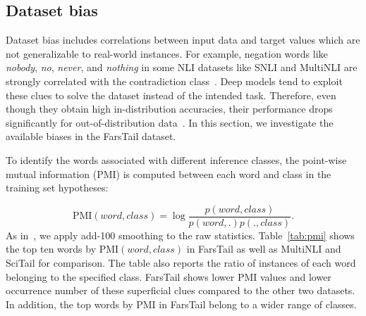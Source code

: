 \documentclass[preprint,12pt]{elsarticle}
\begin{document}
\subsection{Dataset bias}\label{subsec:bias}
Dataset bias includes correlations between input data and target values which are not generalizable to real-world instances. For example, negation words like \textit{nobody}, \textit{no}, \textit{never}, and \textit{nothing} in some NLI datasets like SNLI and MultiNLI are strongly correlated with the contradiction class~\citep{gururangan2018annotation}. Deep models tend to exploit these clues to solve the dataset instead of the intended task. Therefore, even though they obtain high in-distribution accuracies, their performance drops significantly for out-of-distribution data~\citep{mccoy2020right}. In this section, we investigate the available biases in the FarsTail dataset. 

To identify the words associated with different inference classes, the point-wise mutual information (PMI) is computed between each word and class in the training set hypotheses:

\begin{equation*}
    \textrm{PMI}(word,class) = \log\frac{p(word,class)}{p(word,.)p(.,class)}.
\end{equation*}
As in~\citep{gururangan2018annotation,bowman2020new}, we apply add-100 smoothing to the raw statistics. Table~\ref{tab:pmi} shows the top ten words by $\textrm{PMI}(word,class)$ in FarsTail as well as MultiNLI and SciTail for comparison. The table also reports the ratio of instances of each word belonging to the specified class. FarsTail shows lower PMI values and lower occurrence number of these superficial clues compared to the other two datasets. In addition, the top words by PMI in FarsTail belong to a wider range of classes. 
\end{document}
